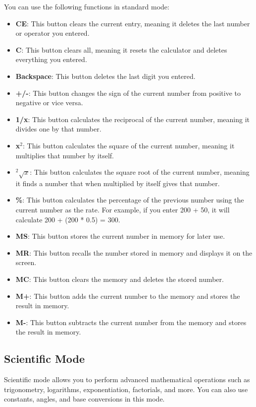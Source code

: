 \documentclass[12pt]{article}
\begin{document}
You can use the following functions in standard mode\cite{calculator-how-to-use}:

\begin{itemize}
    \item \textbf{CE}: This button clears the current entry, meaning it deletes the last number or operator you entered.
    \item \textbf{C}: This button clears all, meaning it resets the calculator and deletes everything you entered.
    \item \textbf{Backspace}: This button deletes the last digit you entered.
    \item \textbf{+/-}: This button changes the sign of the current number from positive to negative or vice versa.
    \item \textbf{1/x}: This button calculates the reciprocal of the current number, meaning it divides one by that number.
    \item \textbf{x$^2$}: This button calculates the square of the current number, meaning it multiplies that number by itself.
    \item \textbf{$^2\sqrt{x}$}: This button calculates the square root of the current number, meaning it finds a number that when multiplied by itself gives that number.
    \item \textbf{\%}: This button calculates the percentage of the previous number using the current number as the rate. For example, if you enter 200 + 50, it will calculate 200 + (200 * 0.5) = 300.
    \item \textbf{MS}: This button stores the current number in memory for later use.
    \item \textbf{MR}: This button recalls the number stored in memory and displays it on the screen.
    \item \textbf{MC}: This button clears the memory and deletes the stored number.
    \item \textbf{M+}: This button adds the current number to the memory and stores the result in memory.
    \item \textbf{M-}: This button subtracts the current number from the memory and stores the result in memory.
\end{itemize}

\pagebreak

\subsection{Scientific Mode}
Scientific mode allows you to perform advanced mathematical operations such as trigonometry, logarithms, exponentiation, factorials, and more. You can also use constants, angles, and base conversions in this mode.
\end{document}
